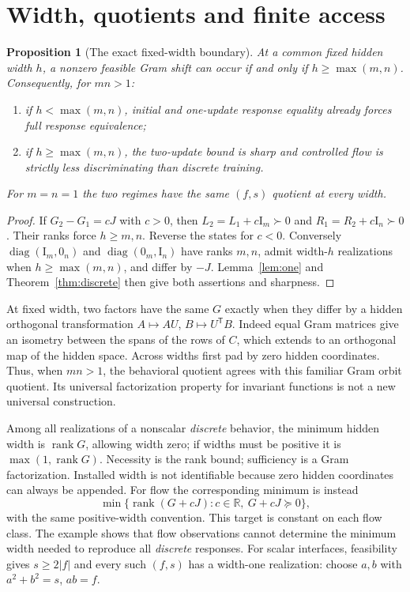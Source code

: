 \documentclass[11pt]{article}
\newtheorem{proposition}[theorem]{Proposition}
\theoremstyle{remark}\newtheorem{remark}[theorem]{Remark}
\newcommand{\R}{\mathbb R}
\newcommand{\Id}{\mathrm I}
\newcommand{\rank}{\operatorname{rank}}
\newcommand{\diag}{\operatorname{diag}}
\begin{document}
\section{Width, quotients and finite access}
\begin{proposition}[The exact fixed-width boundary]\label{prop:width}
At a common fixed hidden width $h$, a nonzero feasible Gram shift can
occur if and only if $h\geq\max(m,n)$. Consequently, for $mn>1$:
\begin{enumerate}[label=(\roman*)]
\item if $h<\max(m,n)$, initial and one-update response equality already
forces full response equivalence;
\item if $h\geq\max(m,n)$, the two-update bound is sharp and controlled
flow is strictly less discriminating than discrete training.
\end{enumerate}
For $m=n=1$ the two regimes have the same $(f,s)$ quotient at every width.
\end{proposition}
\begin{proof}
If $G_2-G_1=cJ$ with $c>0$, then
$L_2=L_1+c\Id_m\succ0$ and $R_1=R_2+c\Id_n\succ0$.
Their ranks force $h\geq m,n$. Reverse the states for $c<0$.
Conversely $\diag(\Id_m,0_n)$ and $\diag(0_m,\Id_n)$ have ranks
$m,n$, admit width-$h$ realizations when $h\geq\max(m,n)$, and differ
by $-J$. Lemma~\ref{lem:one} and Theorem~\ref{thm:discrete} then give
both assertions and sharpness.
\end{proof}

At fixed width, two factors have the same $G$ exactly when they differ
by a hidden orthogonal transformation
$A\mapsto AU$, $B\mapsto U^{\mathsf T}B$.
Indeed equal Gram matrices give an isometry between the spans of the
rows of $C$, which extends to an orthogonal map of the hidden
space. Across widths first pad by zero hidden coordinates. Thus, when
$mn>1$, the behavioral quotient agrees with this familiar Gram orbit
quotient. Its universal factorization property for invariant functions
is not a new universal construction.

Among all realizations of a nonscalar \emph{discrete} behavior, the minimum
hidden width is $\rank G$, allowing width zero; if widths must be positive
it is $\max(1,\rank G)$. Necessity is the rank bound; sufficiency is a Gram
factorization. Installed width is not identifiable because zero hidden
coordinates can always be appended. For flow the corresponding minimum
is instead
\[
 \min\{\rank(G+cJ):c\in\R,\ G+cJ\succeq0\},
\]
with the same positive-width convention. This target is constant on each
flow class. The example shows that flow observations cannot determine
the minimum width needed to reproduce all \emph{discrete} responses.
For scalar interfaces, feasibility gives $s\geq2|f|$ and every such
$(f,s)$ has a width-one realization: choose $a,b$ with
$a^2+b^2=s$, $ab=f$.
\end{document}
